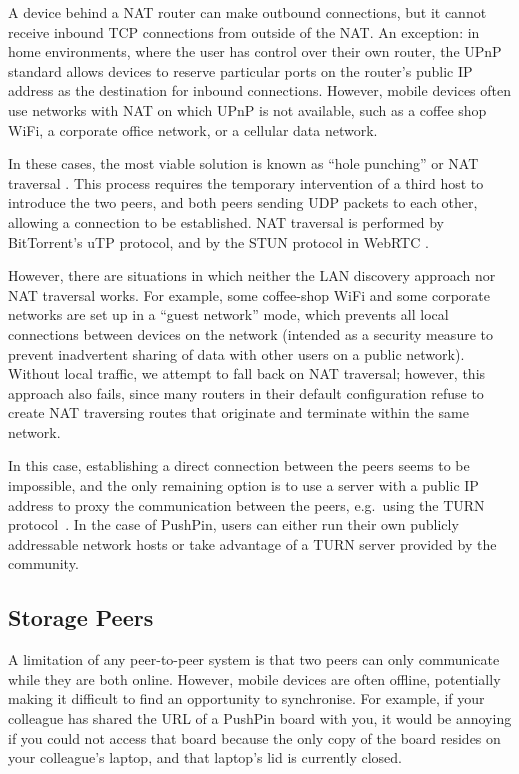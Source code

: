 \documentclass[sigplan,10pt]{acmart}
\begin{document}
A device behind a NAT router can make outbound connections, but it cannot receive inbound TCP connections from outside of the NAT.
An exception: in home environments, where the user has control over their own router, the UPnP standard allows devices to reserve particular ports on the router's public IP address as the destination for inbound connections.
However, mobile devices often use networks with NAT on which UPnP is not available, such as a coffee shop WiFi, a corporate office network, or a cellular data network.

In these cases, the most viable solution is known as ``hole punching'' or NAT traversal \cite{RFC5389}.
This process requires the temporary intervention of a third host to introduce the two peers, and both peers sending UDP packets to each other, allowing a connection to be established.
NAT traversal is performed by BitTorrent's uTP protocol, and by the STUN protocol in WebRTC \cite{RFC5389}.

However, there are situations in which neither the LAN discovery approach nor NAT traversal works.
For example, some coffee-shop WiFi and some corporate networks are set up in a ``guest network'' mode, which prevents all local connections between devices on the network (intended as a security measure to prevent inadvertent sharing of data with other users on a public network).
Without local traffic, we attempt to fall back on NAT traversal; however, this approach also fails, since many routers in their default configuration refuse to create NAT traversing routes that originate and terminate within the same network.

In this case, establishing a direct connection between the peers seems to be impossible, and the only remaining option is to use a server with a public IP address to proxy the communication between the peers, e.g.\ using the TURN protocol~\cite{RFC5766}.
In the case of PushPin, users can either run their own publicly addressable network hosts or take advantage of a TURN server provided by the community.

\subsection{Storage Peers}

A limitation of any peer-to-peer system is that two peers can only communicate while they are both online.
However, mobile devices are often offline, potentially making it difficult to find an opportunity to synchronise.
For example, if your colleague has shared the URL of a PushPin board with you, it would be annoying if you could not access that board because the only copy of the board resides on your colleague's laptop, and that laptop's lid is currently closed.
\end{document}
